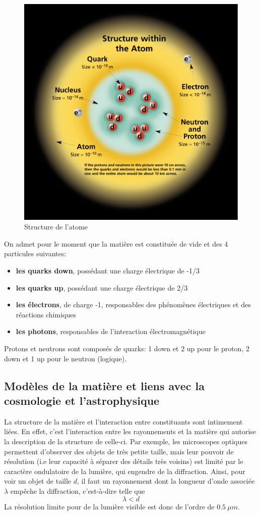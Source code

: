 \begin{figure}[ht]
    \centering
    \includegraphics[scale=0.45]{Images1/atome.png}
    \caption{Structure de l'atome}
    \label{fig:struct_atome}
\end{figure}
On admet pour le moment que la matière est constituée de vide et des 4 particules suivantes:

\begin{itemize}
    \item \textbf{les quarks down}, possédant une charge électrique de -1/3
    \item \textbf{les quarks up}, possédant une charge électrique de 2/3
    \item \textbf{les électrons}, de charge -1, responsables des phénomènes électriques et des réactions chimiques
    \item \textbf{les photons}, responsables de l'interaction électromagnétique
\end{itemize}
Protons et neutrons sont composés de quarks: 1 down et 2 up pour le proton, 2 down et 1 up pour le neutron (logique).

\subsection{Modèles de la matière et liens avec la cosmologie et l'astrophysique}
La structure de la matière et l'interaction entre constituants sont intimement liées. En effet, c'est l'interaction entre les rayonnements et la matière qui autorise la description de la structure de celle-ci. Par exemple, les microscopes optiques permettent d'observer des objets de très petite taille, mais leur pouvoir de résolution (i.e leur capacité à séparer des détails très voisins) est limité par le caractère ondulatoire de la lumière, qui engendre de la diffraction. Ainsi, pour voir un objet de taille $d$, il faut un rayonnement dont la longueur d'onde associée $\lambda$ empêche la diffraction, c'est-à-dire telle que
\[ \lambda < d \]
La résolution limite pour de la lumière visible est donc de l'ordre de $\SI{0.5}{\mu m}$.

